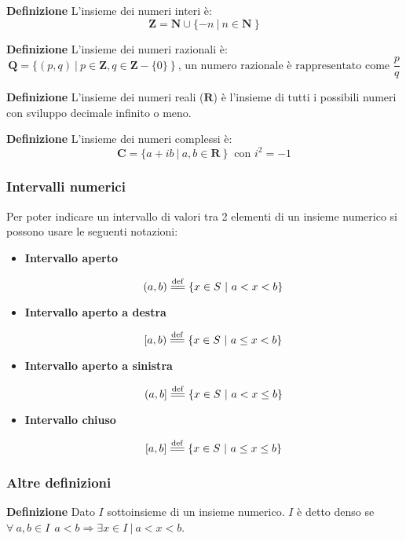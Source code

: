 \documentclass{article}
\newcommand{\defeq}{\overset{\mathrm{def}}{=\joinrel=}}
\begin{document}
\noindent\textbf{Definizione} L'insieme dei numeri interi è:
$$\mathbf{Z}=\mathbf{N}\cup\{-n\ |\ n\in\mathbf{N}\ \}$$\newline

\noindent\textbf{Definizione} L'insieme dei numeri razionali è:
$$\mathbf{Q}=\{(p,q)\ |\ p\in\mathbf{Z},q\in\mathbf{Z}-\{0\}\ \}\ \text{, un numero razionale è rappresentato come }\frac{p}{q}$$\newline

\noindent\textbf{Definizione} L'insieme dei numeri reali ($\mathbf{R}$) è l'insieme di tutti i possibili numeri con sviluppo decimale infinito o meno.\newline

\noindent\textbf{Definizione} L'insieme dei numeri complessi è:
$$\mathbf{C}=\{a+ib\ |\ a,b\in\mathbf{R}\ \}\ \text{ con $i^2=-1$}$$\newline

\subsubsection{Intervalli numerici}

Per poter indicare un intervallo di valori tra 2 elementi di un insieme numerico si possono usare le seguenti notazioni:
\begin{itemize}
    \item \textbf{Intervallo aperto}

    $$(a,b)\defeq \{x\in S\ |\ a<x<b\}$$

    \item \textbf{Intervallo aperto a destra}

    $$[a,b)\defeq \{x\in S\ |\ a\leq x< b\}$$

    \item \textbf{Intervallo aperto a sinistra}

    $$(a,b]\defeq \{x\in S\ |\ a< x\leq b\}$$

    \item \textbf{Intervallo chiuso}

    $$[a,b]\defeq \{x\in S\ |\ a\leq x\leq b\}$$\newline

    
\end{itemize}

\subsubsection{Altre definizioni}

\noindent\textbf{Definizione} Dato $I$ sottoinsieme di un insieme numerico. $I$ è detto denso se $\forall \ a,b\in I\ \ a<b\Rightarrow \exists x\in I\ |\ a<x<b$.\newline
\end{document}
